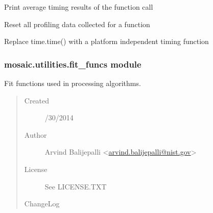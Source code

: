 \documentclass[letterpaper,10pt,english]{sphinxmanual}
\begin{document}
\begin{fulllineitems}
\begin{fulllineitems}
\end{fulllineitems}


\begin{fulllineitems}
\label{api-doc/mosaic.misc:mosaic.utilities.mosaicTiming.mosaicTiming.PrintStatistics}
Print average timing results of the function call

\end{fulllineitems}


\begin{fulllineitems}
\label{api-doc/mosaic.misc:mosaic.utilities.mosaicTiming.mosaicTiming.Reset}
Reset all profiling data collected for a function

\end{fulllineitems}


\begin{fulllineitems}
\label{api-doc/mosaic.misc:mosaic.utilities.mosaicTiming.mosaicTiming.time}
Replace time.time() with a platform independent timing function

\end{fulllineitems}


\end{fulllineitems}



\subsubsection{mosaic.utilities.fit\_funcs module}
\label{api-doc/mosaic.misc:mosaic-utilities-fit-funcs-module}\label{api-doc/mosaic.misc:module-mosaic.utilities.fit_funcs}
Fit functions used in processing algorithms.
\begin{quote}\begin{description}
\item[{Created}] /30/2014

\item[{Author}] \leavevmode
Arvind Balijepalli \textless{}\href{mailto:arvind.balijepalli@nist.gov}{arvind.balijepalli@nist.gov}\textgreater{}

\item[{License}] \leavevmode
See LICENSE.TXT

\item[{ChangeLog}] \leavevmode
\end{description}\end{quote}
\end{document}
